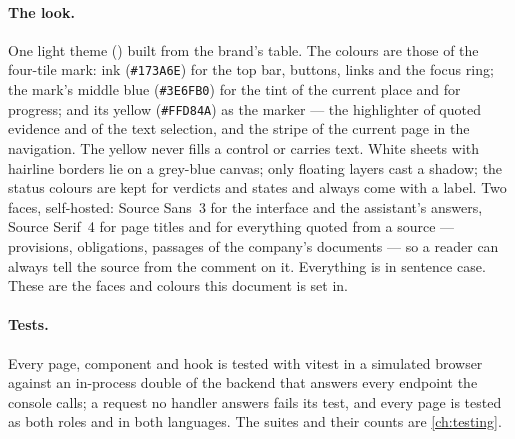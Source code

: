 \paragraph{The look.} One light theme () built from the brand's table. The colours
are those of the four-tile mark: ink (\texttt{\#173A6E}) for the top bar, buttons, links and the
focus ring; the mark's middle blue (\texttt{\#3E6FB0}) for the tint of the current place and for
progress; and its yellow (\texttt{\#FFD84A}) as the marker --- the highlighter of quoted evidence and of the text
selection, and the stripe of the current page in the navigation. The yellow never fills a control
or carries text. White sheets with hairline borders lie on a grey-blue canvas; only floating layers
cast a shadow; the status colours are kept for verdicts and states and always come with a label.
Two faces, self-hosted: Source Sans~3 for the interface and the assistant's answers, Source
Serif~4 for page titles and for everything quoted from a source --- provisions, obligations,
passages of the company's documents --- so a reader can always tell the source from the comment on
it. Everything is in sentence case. These are the faces and colours this document is set in.

\paragraph{Tests.} Every page, component and hook is tested with vitest in a simulated browser
against an in-process double of the backend that answers every endpoint the console calls; a
request no handler answers fails its test, and every page is tested as both roles and in both
languages. The suites and their counts are
\cref{ch:testing}.
